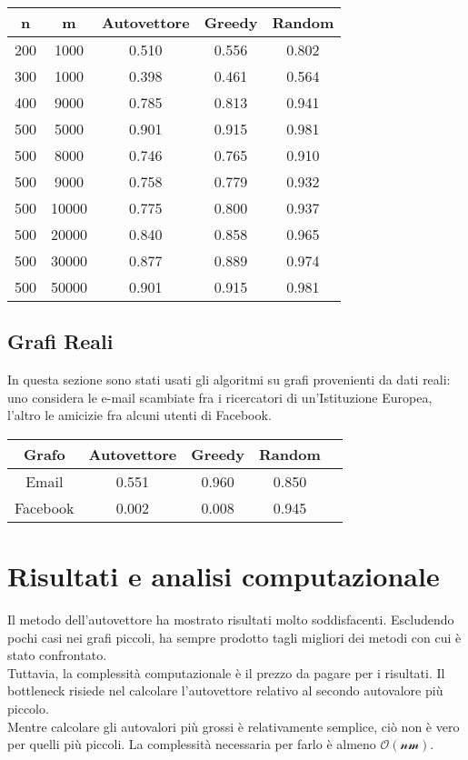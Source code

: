 \documentclass{article}
\begin{document}
\begin{multicols}{2}
\begin{center}
    \begin{tabular}{|c|c|c|c|c|}
        \hline
        n & m & Autovettore & Greedy & Random \\
        \hline
        \hline
        200 & 1000 & 0.510 & 0.556 & 0.802 \\
        300 & 1000 & 0.398 & 0.461 & 0.564 \\
        400 & 9000 & 0.785 & 0.813 & 0.941 \\
        500 & 5000 & 0.901 & 0.915 & 0.981 \\
        500 & 8000 & 0.746 & 0.765 & 0.910 \\
        500 & 9000 & 0.758 & 0.779 & 0.932 \\
        500 & 10000 & 0.775 & 0.800 & 0.937 \\
        500 & 20000 & 0.840 & 0.858 & 0.965 \\
        500 & 30000 & 0.877 & 0.889 & 0.974 \\
        500 & 50000 & 0.901 & 0.915 & 0.981 \\
        \hline
    \end{tabular}
\end{center}

\subsection{Grafi Reali}

In questa sezione sono stati usati gli algoritmi su grafi provenienti da dati reali:
uno considera le e-mail scambiate fra i ricercatori di un'Istituzione Europea, l'altro le amicizie fra alcuni utenti di Facebook.

\begin{center}
    \begin{tabular}{|c|c|c|c|c|}
        \hline
        Grafo & Autovettore & Greedy & Random \\
        \hline
        \hline
        Email & 0.551 & 0.960 & 0.850 \\
        Facebook & 0.002 & 0.008 & 0.945 \\
        \hline
    \end{tabular}
\end{center}




\section{Risultati e analisi computazionale}
Il metodo dell'autovettore ha mostrato risultati molto soddisfacenti. Escludendo pochi casi nei grafi piccoli, ha sempre prodotto tagli migliori dei metodi con cui \`e stato confrontato.\\
Tuttavia, la complessit\`a computazionale \`e il prezzo da pagare per i risultati. Il bottleneck risiede nel calcolare l'autovettore relativo al secondo autovalore pi\`u piccolo.\\
Mentre calcolare gli autovalori pi\`u grossi \`e relativamente semplice, ci\`o non \`e vero per quelli pi\`u piccoli. La complessit\`a necessaria per farlo \`e almeno $\mathcal{O(nm)}$. 


\end{multicols}
\end{document}

